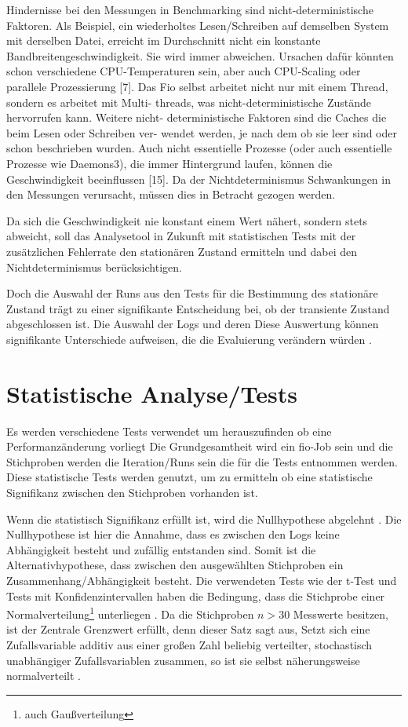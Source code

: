 Hindernisse bei den Messungen in Benchmarking sind nicht-deterministische Faktoren.
Als Beispiel, ein wiederholtes Lesen/Schreiben auf demselben System mit derselben Datei, erreicht im Durchschnitt nicht ein konstante Bandbreitengeschwindigkeit. 
Sie wird immer abweichen. Ursachen dafür könnten schon verschiedene CPU-Temperaturen sein, 
aber auch CPU-Scaling oder parallele Prozessierung [7]. Das Fio
selbst arbeitet nicht nur mit einem Thread, sondern es arbeitet mit Multi-
threads, was nicht-deterministische Zustände hervorrufen kann. Weitere nicht-
deterministische Faktoren sind die Caches die beim Lesen oder Schreiben ver-
wendet werden, je nach dem ob sie leer sind oder schon beschrieben wurden.
Auch nicht essentielle Prozesse (oder auch essentielle Prozesse wie Daemons3),
die immer Hintergrund laufen, können die Geschwindigkeit beeinflussen [15].
Da der Nichtdeterminismus Schwankungen in den Messungen verursacht, müssen dies in Betracht gezogen werden.

Da sich die Geschwindigkeit nie konstant einem Wert nähert, sondern stets
abweicht, soll das Analysetool in Zukunft mit statistischen Tests mit der zusätzlichen Fehlerrate den stationären
Zustand ermitteln und dabei den Nichtdeterminismus berücksichtigen.

Doch die Auswahl der Runs aus den Tests für die Bestimmung des stationäre Zustand trägt zu einer signifikante Entscheidung bei,
 ob der transiente Zustand abgeschlossen ist.
Die Auswahl der Logs und deren Diese Auswertung können signifikante Unterschiede aufweisen, die die Evaluierung
verändern würden \cite{when_stop_tests}.



\section{Statistische Analyse/Tests}
Es werden verschiedene Tests verwendet um herauszufinden ob eine Performanzänderung vorliegt \cite{statistically_rigorous}
Die Grundgesamtheit wird ein fio-Job sein und die Stichproben werden die Iteration/Runs sein die für die Tests entnommen werden.
Diese statistische Tests werden genutzt, um zu ermitteln ob eine statistische Signifikanz zwischen den Stichproben vorhanden ist.

Wenn die statistisch Signifikanz erfüllt ist, wird die Nullhypothese abgelehnt \cite{inferenzstatistik}.
Die Nullhypothese ist hier die Annahme, dass es zwischen den Logs keine Abhängigkeit besteht und zufällig entstanden sind.
Somit ist die Alternativhypothese, dass zwischen den ausgewählten Stichproben ein Zusammenhang/Abhängigkeit besteht.
Die verwendeten Tests wie der t-Test und Tests mit Konfidenzintervallen haben die Bedingung, 
dass die Stichprobe einer Normalverteilung\footnote{auch Gaußverteilung} unterliegen \cite{inferenzstatistik}. 
Da die Stichproben $n > 30$ Messwerte besitzen, ist der Zentrale Grenzwert erfüllt, denn dieser Satz sagt aus, 
Setzt sich eine Zufallsvariable additiv aus einer großen Zahl beliebig verteilter, stochastisch unabhängiger
Zufallsvariablen zusammen, so ist sie selbst näherungsweise normalverteilt \cite{statistically_rigorous}.

